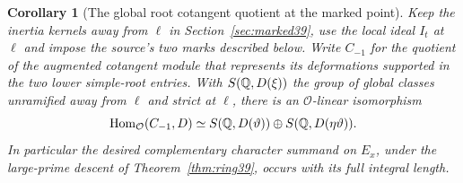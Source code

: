 \documentclass[a4paper,11pt]{article}
\newtheorem{corollary}[proposition]{Corollary}
\theoremstyle{definition}
\theoremstyle{remark}
\numberwithin{equation}{section}
\newcommand{\OO}{\mathcal O}
\begin{document}
\begin{corollary}[The global root cotangent quotient at the marked point]\label{cor:dual68}
Keep the inertia kernels away from \(\ell\) in
Section~\ref{sec:marked39}, use the local ideal \(I_t\) at \(\ell\)
and impose the source's two marks described below. Write
\(C_{-1}\) for the quotient of the augmented cotangent module
that represents its deformations supported in the two lower
simple-root entries. With \(S(\mathbb Q,D(\xi))\) the group of global
classes unramified away from \(\ell\) and strict at \(\ell\),
there is an \(\OO\)-linear isomorphism
\begin{equation}
 \operatorname{Hom}_{\OO}(C_{-1},D)
       \simeq S(\QQ,D(\vartheta))\oplus
                      S(\QQ,D(\eta\vartheta)).           \label{eq:dual68}
\end{equation}
In particular the desired complementary character summand on
\(E_x\), under the large-prime descent of
Theorem~\ref{thm:ring39}, occurs with its full integral length.
\end{corollary}
\end{document}
